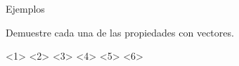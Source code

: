     \begin{frame}{Ejemplos}
        \begin{example}
            Demuestre cada una de las propiedades con vectores.
            \begin{itemize}
                <1>
                <2>
                <3>
                <4>
                <5>
                <6>
            \end{itemize}
        \end{example}
    \end{frame}
